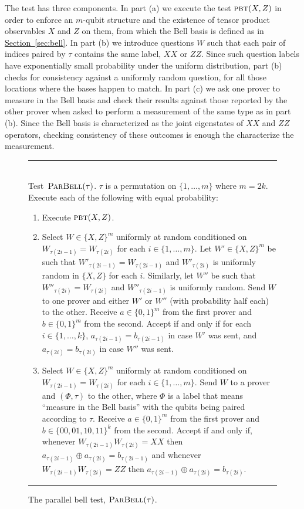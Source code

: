 \documentclass[11pt]{article}
\numberwithin{equation}{section}
\theoremstyle{definition}
\theoremstyle{plain}
\newcommand{\expref}[2]{\hyperref[#2]{#1~\ref{#2}}}
\newcommand{\pbt}{\textsc{pbt}}
\newcommand{\pbellt}{\textsc{ParBell}}
\begin{document}
The test has three components. In part (a) we execute the test $\pbt(X,Z)$ in order to enforce an $m$-qubit structure and the existence of tensor product observables $X$ and $Z$ on them, from which the Bell basis is defined as in \expref{Section}{sec:bell}. In part (b) we introduce questions $W$ such that each pair of indices paired by $\tau$ contains the same label, $XX$ or $ZZ$. Since such question labels have exponentially small probability under the uniform distribution, part (b) checks for consistency against a uniformly random question, for all those locations where the bases happen to match. 
In part (c) we ask one prover to measure in the Bell basis and check their results against those reported by the other prover when asked to perform a measurement of the same type as in part (b). Since the Bell basis is characterized as the joint eigenstates of $XX$ and $ZZ$ operators, checking consistency of these outcomes is enough the characterize the measurement. 


\begin{figure}[H]
\rule[1ex]{\textwidth}{0.5pt}\\
\justifying
Test~$\pbellt(\tau)$. $\tau$ is a permutation on $\{1,\ldots,m\}$ where  $m=2k$. \\
Execute each of the following with equal probability: 
\begin{enumerate}
\item[(a)] Execute $\pbt(X,Z)$.
\item[(b)] Select $W\in \{X,Z\}^m$ uniformly at random conditioned on $W_{\tau(2i-1)}=W_{\tau(2i)}$ for each $i\in\{1,\ldots,m\}$. Let $W' \in \{X,Z\}^m$ be such that $W'_{\tau(2i-1)}=W_{\tau(2i-1)}$ and $W'_{\tau(2i)}$ is uniformly random in $\{X,Z\}$ for each $i$. Similarly, let $W''$ be such that $W''_{\tau(2i)}=W_{\tau(2i)}$ and $W''_{\tau(2i-1)}$ is uniformly random. Send $W$ to one prover and either $W'$ or $W''$ (with probability half each) to the other. Receive $a\in\{0,1\}^m$ from the first prover and $b\in\{0,1\}^m$ from the second. Accept if and only if for each $i\in\{1,\ldots,k\}$, $a_{\tau(2i-1)}=b_{\tau(2i-1)}$ in case $W'$ was sent, and $a_{\tau(2i)}=b_{\tau(2i)}$ in case $W''$ was sent.
\item[(c)] Select $W\in \{X,Z\}^m$ uniformly at random conditioned on $W_{\tau(2i-1)}=W_{\tau(2i)}$ for each $i\in\{1,\ldots,m\}$. Send $W$ to a prover and $(\Phi,\tau)$ to the other, where $\Phi$ is a label that means ``measure in the Bell basis'' with the qubits being paired according to $\tau$. Receive $a\in\{0,1\}^m$ from the first prover and $b\in\{00,01,10,11\}^k$ from the second. Accept if and only if, whenever $W_{\tau(2i-1)}W_{\tau(2i)}=XX$ then $a_{\tau(2i-1)}\oplus a_{\tau(2i)}=b_{\tau(2i-1)}$ and whenever $W_{\tau(2i-1)}W_{\tau(2i)}=ZZ$ then $a_{\tau(2i-1)}\oplus a_{\tau(2i)}=b_{\tau(2i)}$.
\end{enumerate}
\rule[2ex]{\textwidth}{0.5pt}\vspace{-.5cm}
\caption{The parallel bell test, $\pbellt(\tau)$.}
\label{fig:pbell-test}
\end{figure}
\end{document}
